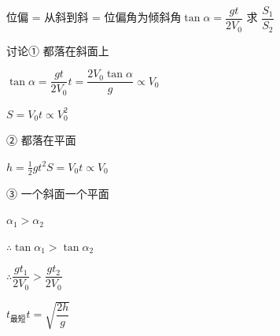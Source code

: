 \noindent 位偏 = 从斜到斜 = 位偏角为倾斜角\qquad $\tan\alpha=\dfrac{gt}{2V_0}$
\noindent 求 $\dfrac{S_1}{S_2}$

\noindent 讨论\quad ① 都落在斜面上

\noindent $\tan\alpha=\dfrac{gt}{2V_0}$\qquad $t=\dfrac{2V_0\tan\alpha}{g}\propto V_0$\qquad {}

\noindent $S=V_0t\propto V_0^2$\qquad {}%

\noindent ② 都落在平面

\noindent $h=\tfrac12gt^2$\quad {}\quad $S=V_0t\propto V_0$\quad {}

\noindent ③ 一个斜面一个平面

\noindent $\alpha_1>\alpha_2$

\noindent $\therefore\tan\alpha_1>\tan\alpha_2$

\noindent $\therefore\dfrac{gt_1}{2V_0}>\dfrac{gt_2}{2V_0}$

\noindent {}%
\noindent $t_{\text{最短}}$\quad $t=\sqrt{\dfrac{2h}{g}}$

